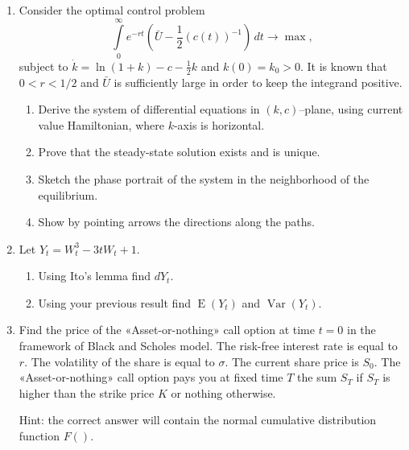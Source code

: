 \documentclass[12pt, a4paper]{article}
\DeclareMathOperator{\Var}{Var}
\DeclareMathOperator{\E}{E}
\begin{document}
\begin{enumerate}


\item Consider the optimal control problem
\[
\int\limits_0^\infty  e^{ - rt} \left(\bar U - \frac{1}{2} (c(t))^{-1} \right) \, dt \to \max,
\]
subject to $\dot k = \ln (1 + k) - c - \frac{1}{2}k$ and $k(0) = {k_0} > 0$.
It is known that $0 < r < 1/2$ and $\bar U$ is sufficiently large in order to keep the integrand positive.
\begin{enumerate}
\item Derive the system of differential equations in  $(k, c)$–plane, using current value Hamiltonian, where $k$-axis is horizontal.
\item Prove that the steady-state solution exists and is unique.
\item Sketch the phase portrait of the system in the neighborhood of the equilibrium.
\item Show by pointing arrows the directions along the paths.
\end{enumerate}

\item Let $Y_t=W_t^3-3tW_t + 1$.
\begin{enumerate}
\item Using Ito’s lemma find $dY_t$.
\item Using your previous result find $\E(Y_t)$ and $\Var(Y_t)$.
\end{enumerate}


\item Find the price of the «Asset-or-nothing» call option at time $t=0$ in the framework of Black and Scholes model. The risk-free interest rate is equal to $r$. The volatility of the share is equal to $\sigma$. The current share price is $S_0$. The «Asset-or-nothing» call option pays you at fixed time $T$ the sum $S_T$ if $S_T$ is higher than the strike price $K$ or nothing otherwise.

Hint: the correct answer will contain the normal cumulative distribution function $F()$.



\end{enumerate}

\end{document}

